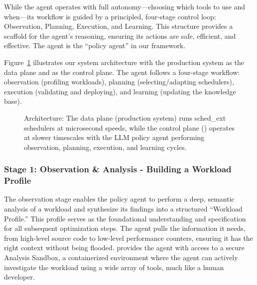 While the agent operates with full autonomy—choosing which tools to use and when—its workflow is guided by a principled, four-stage control loop: Observation, Planning, Execution, and Learning. This structure provides a scaffold for the agent's reasoning, ensuring its actions are safe, efficient, and effective. The agent is the ``policy agent'' in our framework.

Figure~\ref{fig:architecture} illustrates our system architecture with the production system as the data plane and \sys as the control plane. The agent follows a four-stage workflow: observation (profiling workloads), planning (selecting/adapting schedulers), execution (validating and deploying), and learning (updating the knowledge base).

\begin{figure}[h]
\centering
{}
\caption{\sys Architecture: The data plane (production system) runs sched\_ext schedulers at microsecond speeds, while the control plane (\sys) operates at slower timescales with the LLM policy agent performing observation, planning, execution, and learning cycles.}
\label{fig:architecture}
\end{figure}


\subsubsection{Stage 1: Observation \& Analysis - Building a Workload Profile}

The observation stage enables the policy agent to perform a deep, semantic analysis of a workload and synthesize its findings into a structured ``Workload Profile.'' This profile serves as the foundational understanding and specification for all subsequent optimization steps. The agent pulls the information it needs, from high-level source code to low-level performance counters, ensuring it has the right context without being flooded. \sys provides the agent with access to a secure Analysis Sandbox, a containerized environment where the agent can actively investigate the workload using a wide array of tools, much like a human developer.

